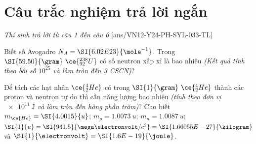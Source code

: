 \section{Câu trắc nghiệm trả lời ngắn} \textit{Thí sinh trả lời từ câu 1 đến câu 6}
\setcounter{ex}{0}
[ans/VN12-Y24-PH-SYL-033-TL]
\begin{ex}
	Biết số Avogadro $N_A=\SI{6.02E23}{\mole^{-1}}$. Trong $\SI{59.50}{\gram}\ \ce{^{238}_{92}U}$ có số neutron xấp xỉ là bao nhiêu \textit{(Kết quả tính theo bội số $10^{25}$ và làm tròn đến 3 CSCN)}?
\end{ex}
\begin{ex}
	Để tách các hạt nhân $\ce{^4_2He}$ có trong $\SI{1}{\gram}\ \ce{^4_2He}$ thành các proton và neutron tự do thì cần năng lượng bao nhiêu \textit{(tính theo đơn vị $\SI{e11}{\joule}$ và làm tròn đến hàng phần trăm)}? Cho biết $m_{\ce{He}}=\SI{4.0015}{u}$; $m_p=\SI{1.0073}{u}$; $m_n=\SI{1.0087}{u}$; $\SI{1}{u}=\SI{931.5}{\mega\electronvolt/c^2}=\SI{1.66055E-27}{\kilogram}$ và $\SI{1}{\electronvolt}=\SI{1.6E-19}{\joule}$.
\end{ex}
